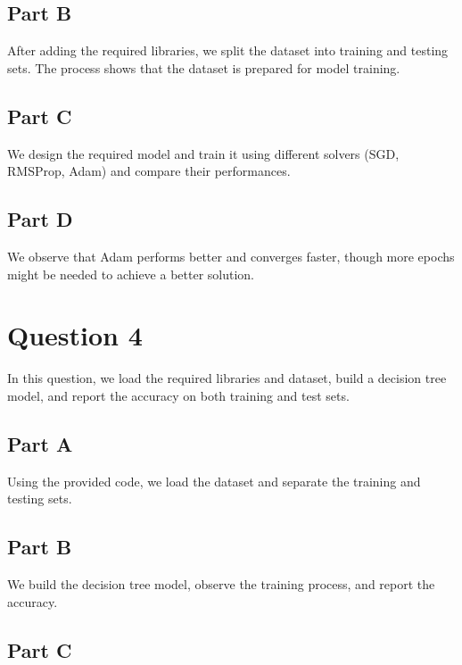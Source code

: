 \documentclass[DIV=calc, paper=a4, fontsize=11pt, twocolumn]{scrartcl}	 %
\begin{document}
  \subsection*{Part B}
    
    After adding the required libraries, we split the dataset into training and testing sets. The process shows that the dataset is prepared for model training.
    
  \subsection*{Part C}
    
    We design the required model and train it using different solvers (SGD, RMSProp, Adam) and compare their performances.
    
  \subsection*{Part D}
    
    We observe that Adam performs better and converges faster, though more epochs might be needed to achieve a better solution.

\section*{\small{Question 4}}

    In this question, we load the required libraries and dataset, build a decision tree model, 
    and report the accuracy on both training and test sets.
    
  \subsection*{\small{Part A}}
    
    Using the provided code, we load the dataset and separate the training and testing sets.
    
  \subsection*{\small{Part B}}
    
    We build the decision tree model, observe the training process, and report the accuracy.
    
  \subsection*{\small{Part C}}
    
\end{document}
